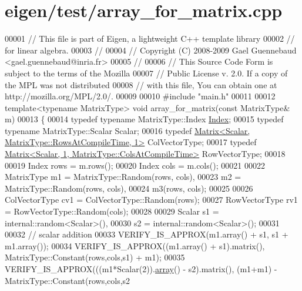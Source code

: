 \hypertarget{eigen_2test_2array__for__matrix_8cpp_source}{}\section{eigen/test/array\+\_\+for\+\_\+matrix.cpp}
\label{eigen_2test_2array__for__matrix_8cpp_source}

\begin{DoxyCode}
00001 \textcolor{comment}{// This file is part of Eigen, a lightweight C++ template library}
00002 \textcolor{comment}{// for linear algebra.}
00003 \textcolor{comment}{//}
00004 \textcolor{comment}{// Copyright (C) 2008-2009 Gael Guennebaud <gael.guennebaud@inria.fr>}
00005 \textcolor{comment}{//}
00006 \textcolor{comment}{// This Source Code Form is subject to the terms of the Mozilla}
00007 \textcolor{comment}{// Public License v. 2.0. If a copy of the MPL was not distributed}
00008 \textcolor{comment}{// with this file, You can obtain one at http://mozilla.org/MPL/2.0/.}
00009 
00010 \textcolor{preprocessor}{#include "main.h"}
00011 
00012 \textcolor{keyword}{template}<\textcolor{keyword}{typename} MatrixType> \textcolor{keywordtype}{void} array\_for\_matrix(\textcolor{keyword}{const} MatrixType& m)
00013 \{
00014   \textcolor{keyword}{typedef} \textcolor{keyword}{typename} MatrixType::Index \hyperlink{namespace_eigen_a62e77e0933482dafde8fe197d9a2cfde}{Index};
00015   \textcolor{keyword}{typedef} \textcolor{keyword}{typename} MatrixType::Scalar Scalar;
00016   \textcolor{keyword}{typedef} \hyperlink{group___core___module_class_eigen_1_1_matrix}{Matrix<Scalar, MatrixType::RowsAtCompileTime, 1>} 
      ColVectorType;
00017   \textcolor{keyword}{typedef} \hyperlink{group___core___module_class_eigen_1_1_matrix}{Matrix<Scalar, 1, MatrixType::ColsAtCompileTime>} 
      RowVectorType; 
00018 
00019   Index rows = m.rows();
00020   Index cols = m.cols();
00021 
00022   MatrixType m1 = MatrixType::Random(rows, cols),
00023              m2 = MatrixType::Random(rows, cols),
00024              m3(rows, cols);
00025 
00026   ColVectorType cv1 = ColVectorType::Random(rows);
00027   RowVectorType rv1 = RowVectorType::Random(cols);
00028   
00029   Scalar  s1 = internal::random<Scalar>(),
00030           s2 = internal::random<Scalar>();
00031           
00032   \textcolor{comment}{// scalar addition}
00033   VERIFY\_IS\_APPROX(m1.array() + s1, s1 + m1.array());
00034   VERIFY\_IS\_APPROX((m1.array() + s1).matrix(), MatrixType::Constant(rows,cols,s1) + m1);
00035   VERIFY\_IS\_APPROX(((m1*Scalar(2)).\hyperlink{class_eigen_1_1array}{array}() - s2).matrix(), (m1+m1) - MatrixType::Constant(rows,cols,s2

\end{DoxyCode}
